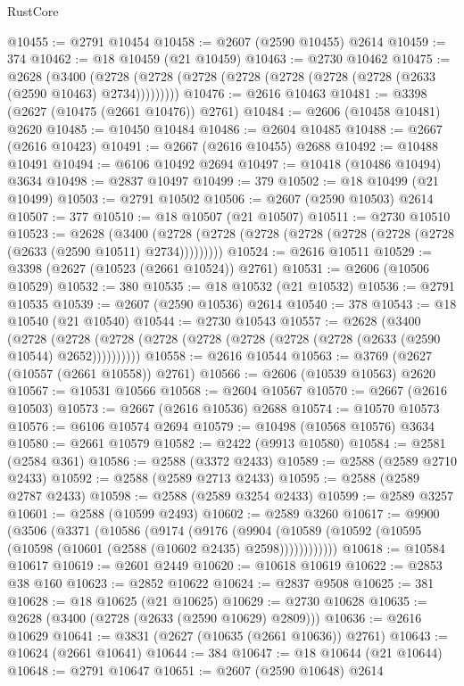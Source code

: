 \begin{lexlean}{RustCore}
\begin{coremodule}
@10455 := @2791 @10454
@10458 := @2607 (@2590 @10455) @2614
@10459 := 374
@10462 := @18 @10459 (@21 @10459)
@10463 := @2730 @10462
@10475 := @2628
    (@3400 (@2728 (@2728 (@2728 (@2728 (@2728 (@2728 (@2728 (@2633 (@2590 @10463) @2734)))))))))
@10476 := @2616 @10463
@10481 := @3398 (@2627 (@10475 (@2661 @10476)) @2761)
@10484 := @2606 (@10458 @10481) @2620
@10485 := @10450 @10484
@10486 := @2604 @10485
@10488 := @2667 (@2616 @10423)
@10491 := @2667 (@2616 @10455) @2688
@10492 := @10488 @10491
@10494 := @6106 @10492 @2694
@10497 := @10418 (@10486 @10494) @3634
@10498 := @2837 @10497
@10499 := 379
@10502 := @18 @10499 (@21 @10499)
@10503 := @2791 @10502
@10506 := @2607 (@2590 @10503) @2614
@10507 := 377
@10510 := @18 @10507 (@21 @10507)
@10511 := @2730 @10510
@10523 := @2628
    (@3400 (@2728 (@2728 (@2728 (@2728 (@2728 (@2728 (@2728 (@2633 (@2590 @10511) @2734)))))))))
@10524 := @2616 @10511
@10529 := @3398 (@2627 (@10523 (@2661 @10524)) @2761)
@10531 := @2606 (@10506 @10529)
@10532 := 380
@10535 := @18 @10532 (@21 @10532)
@10536 := @2791 @10535
@10539 := @2607 (@2590 @10536) @2614
@10540 := 378
@10543 := @18 @10540 (@21 @10540)
@10544 := @2730 @10543
@10557 := @2628
    (@3400
      (@2728 (@2728 (@2728 (@2728 (@2728 (@2728 (@2728 (@2728 (@2633 (@2590 @10544) @2652))))))))))
@10558 := @2616 @10544
@10563 := @3769 (@2627 (@10557 (@2661 @10558)) @2761)
@10566 := @2606 (@10539 @10563) @2620
@10567 := @10531 @10566
@10568 := @2604 @10567
@10570 := @2667 (@2616 @10503)
@10573 := @2667 (@2616 @10536) @2688
@10574 := @10570 @10573
@10576 := @6106 @10574 @2694
@10579 := @10498 (@10568 @10576) @3634
@10580 := @2661 @10579
@10582 := @2422 (@9913 @10580)
@10584 := @2581 (@2584 @361)
@10586 := @2588 (@3372 @2433)
@10589 := @2588 (@2589 @2710 @2433)
@10592 := @2588 (@2589 @2713 @2433)
@10595 := @2588 (@2589 @2787 @2433)
@10598 := @2588 (@2589 @3254 @2433)
@10599 := @2589 @3257
@10601 := @2588 (@10599 @2493)
@10602 := @2589 @3260
@10617 := @9900
    (@3506
      (@3371
        (@10586
          (@9174
            (@9176
              (@9904 (@10589 (@10592 (@10595 (@10598 (@10601 (@2588 (@10602 @2435) @2598))))))))))))
@10618 := @10584 @10617
@10619 := @2601 @2449
@10620 := @10618 @10619
@10622 := @2853 @38 @160
@10623 := @2852 @10622
@10624 := @2837 @9508
@10625 := 381
@10628 := @18 @10625 (@21 @10625)
@10629 := @2730 @10628
@10635 := @2628 (@3400 (@2728 (@2633 (@2590 @10629) @2809)))
@10636 := @2616 @10629
@10641 := @3831 (@2627 (@10635 (@2661 @10636)) @2761)
@10643 := @10624 (@2661 @10641)
@10644 := 384
@10647 := @18 @10644 (@21 @10644)
@10648 := @2791 @10647
@10651 := @2607 (@2590 @10648) @2614

\end{coremodule}
\end{lexlean}
